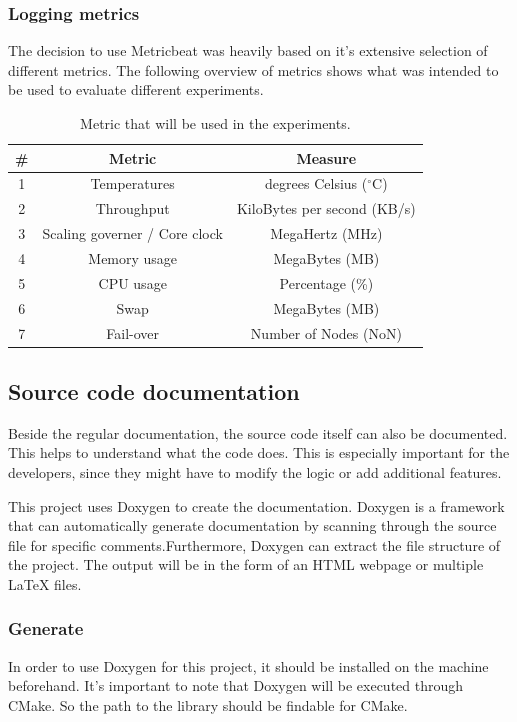 \documentclass[]{article}
\begin{document}
\subsubsection{Logging metrics}
The decision to use Metricbeat was heavily based on it’s extensive selection of different metrics. The following overview of metrics shows what was intended to be used to evaluate different experiments.

\begin{table}[H]
	\begin{center}
		\begin{tabular}{ | c | c | c | }
			\hline
			\textbf{\#} & \textbf{Metric} & \textbf{Measure} \\ \hline
			
			1 & Temperatures & degrees Celsius ($^\circ$C) \\ \hline
			2 & Throughput & KiloBytes per second (KB/s) \\ \hline
			3 & Scaling governer / Core clock & MegaHertz (MHz) \\ \hline
			4 & Memory usage & MegaBytes (MB) \\ \hline
			5 & CPU usage & Percentage (\%) \\ \hline
			6 & Swap & MegaBytes (MB) \\ \hline
			7 & Fail-over & Number of Nodes (NoN)\\ \hline
		\end{tabular}
		\caption{Metric that will be used in the experiments.}
		\label{tab:metrics}
	\end{center}
\end{table}


\subsection{Source code documentation}
Beside the regular documentation, the source code itself can also be documented. This helps to understand what the code does. This is especially important for the developers, since they might have to modify the logic or add additional features.

This project uses Doxygen to create the documentation. Doxygen is a framework that can automatically generate documentation by scanning through the source file for specific comments.Furthermore, Doxygen can extract the file structure of the project. The output will be in the form of an HTML webpage or multiple LaTeX files. 

\subsubsection{Generate}
In order to use Doxygen for this project, it should be installed on the machine beforehand. It’s important to note that Doxygen will be executed through CMake. So the path to the library should be findable for CMake.
\end{document}
